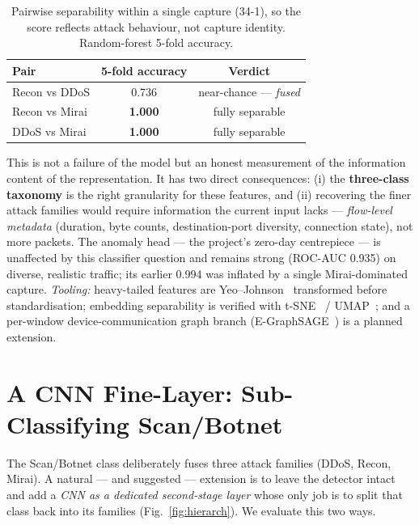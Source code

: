 \documentclass[11pt,a4paper]{article}
\begin{document}
\begin{table}[H]
\centering\small
\caption{Pairwise separability within a single capture (34-1), so the score
reflects attack behaviour, not capture identity. Random-forest 5-fold accuracy.}
\label{tab:pairwise}
\renewcommand{\arraystretch}{1.15}
\begin{tabular}{@{}lcc@{}}
\toprule
\textbf{Pair} & \textbf{5-fold accuracy} & \textbf{Verdict} \\
\midrule
Recon vs DDoS  & 0.736 & near-chance --- \emph{fused} \\
Recon vs Mirai & \textbf{1.000} & fully separable \\
DDoS vs Mirai  & \textbf{1.000} & fully separable \\
\bottomrule
\end{tabular}
\end{table}

This is not a failure of the model but an honest measurement of the information
content of the representation. It has two direct consequences: (i) the
\textbf{three-class taxonomy} is the right granularity for these features, and
(ii) recovering the finer attack families would require information the current
input lacks --- \emph{flow-level metadata} (duration, byte counts, destination-port
diversity, connection state), not more packets. The anomaly head --- the
project's zero-day centrepiece --- is unaffected by this classifier question and
remains strong (ROC-AUC 0.935) on diverse, realistic traffic; its earlier 0.994
was inflated by a single Mirai-dominated capture. \emph{Tooling:} heavy-tailed
features are Yeo--Johnson~\cite{yeojohnson} transformed before standardisation;
embedding separability is verified with t-SNE~\cite{tsne} / UMAP~\cite{umap}; and a
per-window device-communication graph branch (E-GraphSAGE~\cite{egraphsage}) is a
planned extension.

\section{A CNN Fine-Layer: Sub-Classifying Scan/Botnet}
\label{sec:cnn}

The Scan/Botnet class deliberately fuses three attack families (DDoS, Recon,
Mirai). A natural --- and suggested --- extension is to leave the detector intact
and add a \emph{CNN as a dedicated second-stage layer} whose only job is to split
that class back into its families (Fig.~\ref{fig:hierarch}). We evaluate this two
ways.
\end{document}
